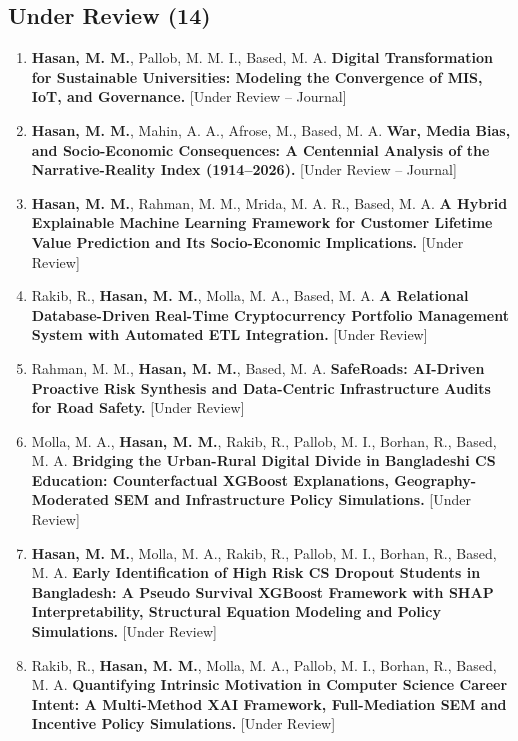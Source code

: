 \documentclass[a4paper,11pt]{article}
\begin{document}
\subsection*{\normalsize Under Review \textnormal{(14)}}
\begin{enumerate}[leftmargin=1.5em, itemsep=6pt, topsep=0pt, resume]

\item \textbf{Hasan, M. M.}, Pallob, M. M. I., Based, M. A.
\textbf{Digital Transformation for Sustainable Universities: Modeling the Convergence of MIS, IoT, and Governance.}
[Under Review -- Journal]

\item \textbf{Hasan, M. M.}, Mahin, A. A., Afrose, M., Based, M. A.
\textbf{War, Media Bias, and Socio-Economic Consequences: A Centennial Analysis of the Narrative-Reality Index (1914--2026).}
[Under Review -- Journal]

\item \textbf{Hasan, M. M.}, Rahman, M. M., Mrida, M. A. R., Based, M. A.
\textbf{A Hybrid Explainable Machine Learning Framework for Customer Lifetime Value Prediction and Its Socio-Economic Implications.}
[Under Review]

\item Rakib, R., \textbf{Hasan, M. M.}, Molla, M. A., Based, M. A.
\textbf{A Relational Database-Driven Real-Time Cryptocurrency Portfolio Management System with Automated ETL Integration.}
[Under Review]

\item Rahman, M. M., \textbf{Hasan, M. M.}, Based, M. A.
\textbf{SafeRoads: AI-Driven Proactive Risk Synthesis and Data-Centric Infrastructure Audits for Road Safety.}
[Under Review]

\item Molla, M. A., \textbf{Hasan, M. M.}, Rakib, R., Pallob, M. I., Borhan, R., Based, M. A.
\textbf{Bridging the Urban-Rural Digital Divide in Bangladeshi CS Education: Counterfactual XGBoost Explanations, Geography-Moderated SEM and Infrastructure Policy Simulations.}
[Under Review]

\item \textbf{Hasan, M. M.}, Molla, M. A., Rakib, R., Pallob, M. I., Borhan, R., Based, M. A.
\textbf{Early Identification of High Risk CS Dropout Students in Bangladesh: A Pseudo Survival XGBoost Framework with SHAP Interpretability, Structural Equation Modeling and Policy Simulations.}
[Under Review]

\item Rakib, R., \textbf{Hasan, M. M.}, Molla, M. A., Pallob, M. I., Borhan, R., Based, M. A.
\textbf{Quantifying Intrinsic Motivation in Computer Science Career Intent: A Multi-Method XAI Framework, Full-Mediation SEM and Incentive Policy Simulations.}
[Under Review]


\end{enumerate}
\end{document}
